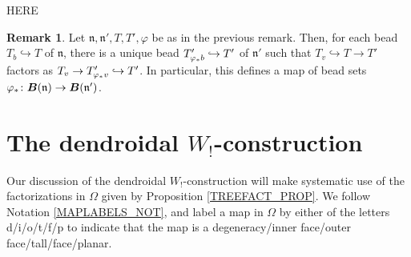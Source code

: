 \documentclass[a4paper,10pt
,draft
]{article}%
\numberwithin{equation}{section}
\numberwithin{figure}{section}
\theoremstyle{definition} %
\newtheorem{remark}[equation]{Remark}%
\newcommand{\1}{\ensuremath{\mathbbm 1}}%
\begin{document}
{\color{red} HERE}


\begin{remark}\label{BEADMAP REM}
	Let $\mathfrak{n},\mathfrak{n}',T,T',\varphi$ be as in the previous remark.
%
	Then, for each bead $T_{b} \hookrightarrow T$
	of $\mathfrak{n}$,
	there is a unique bead
	$T'_{\varphi_{\**} b} \hookrightarrow T'$
	of $\mathfrak{n}'$
	such that
	$T_v \hookrightarrow T \to T'$
	factors as
	$T_v \to T'_{\varphi_{\**}v} \hookrightarrow T'$.
%	
	In particular, 
	this defines a map of bead sets
	$\varphi_{\**} \colon 
	\boldsymbol{B}(\mathfrak{n}) \to 
	\boldsymbol{B}(\mathfrak{n}')$.
\end{remark}




\section{The dendroidal $W_!$-construction}\label{WCONS SEC}



Our discussion of the dendroidal $W_!$-construction
will make systematic
use of the factorizations in $\Omega$ given by 
Proposition \ref{TREEFACT_PROP}.
We follow Notation \ref{MAPLABELS_NOT},
and label 
a map in $\Omega$
by either of the letters d/i/o/t/f/p
to indicate that the map is
a degeneracy/inner face/outer face/tall/face/planar.
\end{document}
